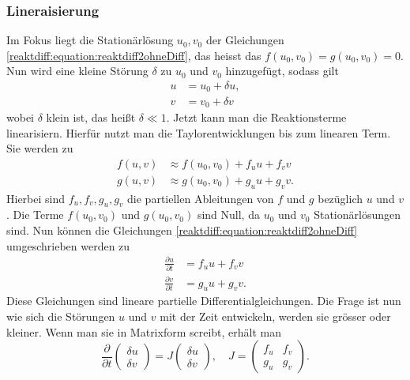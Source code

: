 \subsubsection{Lineraisierung}
Im Fokus liegt die Stationärlösung \(u_0, v_0\) der Gleichungen \eqref{reaktdiff:equation:reaktdiff2ohneDiff}, das heisst das \(f(u_0,v_0) = g(u_0,v_0) = 0\).
Nun wird eine kleine Störung $\delta$ zu $u_0$ und $v_0$ hinzugefügt, sodass gilt
\begin{align*}
    u &= u_0 + \delta u,\\
    v &= v_0 + \delta v
\end{align*}
wobei $\delta$ klein ist, das heißt $\delta \ll 1$.
Jetzt kann man die Reaktionsterme linearisiern.
Hierfür nutzt man die Taylorentwicklungen bis zum linearen Term.
Sie werden zu
\begin{align}
    f(u,v) &\approx f(u_0,v_0) + f_u  u + f_v v\\
    g(u,v) &\approx g(u_0,v_0) + g_u  u + g_v v.
\end{align}
Hierbei sind \(f_u, f_v, g_u, g_v\) die partiellen Ableitungen von \(f\) und \(g\) bezüglich \(u\) und \(v\).
Die Terme \(f(u_0,v_0)\) und \(g(u_0,v_0)\) sind Null, da \(u_0\) und \(v_0\) Stationärlösungen sind.
Nun können die Gleichungen \eqref{reaktdiff:equation:reaktdiff2ohneDiff} umgeschrieben werden zu
\begin{align}
    \label{reaktdiff:equation:reaktdiff2ohneDifflinearisiert1}
    \frac{\partial u}{\partial t} &= f_u u + f_v v\\
    \label{reaktdiff:equation:reaktdiff2ohneDifflinearisiert2}
    \frac{\partial v}{\partial t} &= g_u u + g_v  v.
\end{align}
Diese Gleichungen sind lineare partielle Differentialgleichungen.
Die Frage ist nun wie sich die Störungen \(u\) und \(v\) mit der Zeit entwickeln, werden sie grösser oder kleiner.
Wenn man sie in Matrixform screibt, erhält man
\begin{equation*}
    \label{reaktdiff:equation:reaktdiff2ohneDiffmatrix}
    \frac{\partial}{\partial t} \begin{pmatrix}
        \delta u\\
        \delta v
    \end{pmatrix} = 
    J 
    \begin{pmatrix}
        \delta u\\
        \delta v
    \end{pmatrix}
    , \quad
    J =
    \begin{pmatrix}
        f_u & f_v\\
        g_u & g_v
    \end{pmatrix}.
\end{equation*}

